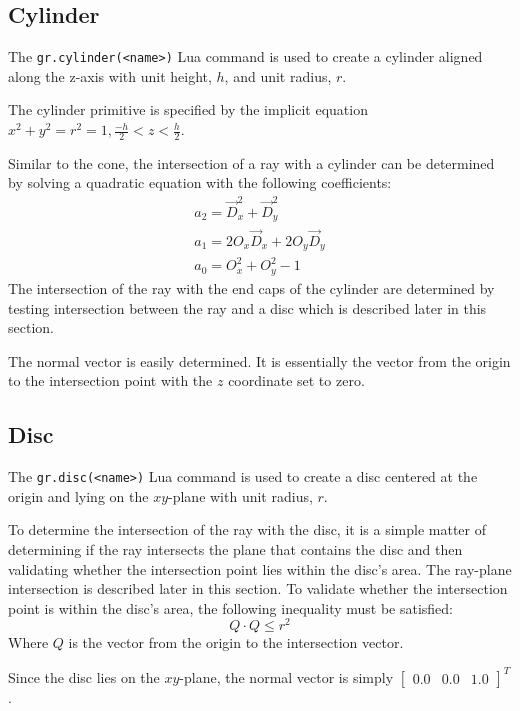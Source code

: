 \subsection*{Cylinder}
The \verb|gr.cylinder(<name>)| Lua command is used to create a cylinder aligned
along the z-axis with unit height, $h$, and unit radius, $r$.

The cylinder primitive is specified by the implicit equation $x^2 + y^2 = r^2 =
1, \frac{-h}{2} < z < \frac{h}{2}$.

Similar to the cone, the intersection of a ray with a cylinder can be determined
by solving a quadratic equation with the following coefficients:
\begin{equation}
\begin{split}
  a_{2} = \vec{D}_{x}^2 + \vec{D}_{y}^2 \\
  a_{1} = 2O_{x}\vec{D}_{x} + 2O_{y}\vec{D}_{y} \\
  a_{0} = O_{x}^2 + O_{y}^2 - 1
\end{split}
\end{equation}
The intersection of the ray with the end caps of the cylinder are determined by
testing intersection between the ray and a disc which is described later in this
section.

The normal vector is easily determined. It is essentially the vector from the
origin to the intersection point with the $z$ coordinate set to zero.

\subsection*{Disc}
The \verb|gr.disc(<name>)| Lua command is used to create a disc centered at the
origin and lying on the $xy$-plane with unit radius, $r$.

To determine the intersection of the ray with the disc, it is a simple matter of
determining if the ray intersects the plane that contains the disc and then
validating whether the intersection point lies within the disc's area. The
ray-plane intersection is described later in this section. To validate whether
the intersection point is within the disc's area, the following inequality must
be satisfied:
\begin{equation}
  Q\cdot Q \leq r^2
\end{equation}
Where $Q$ is the vector from the origin to the intersection vector.

Since the disc lies on the $xy$-plane, the normal vector is simply \newline
$\begin{bmatrix} 0.0 & 0.0 & 1.0
\end{bmatrix}^{T}$.

